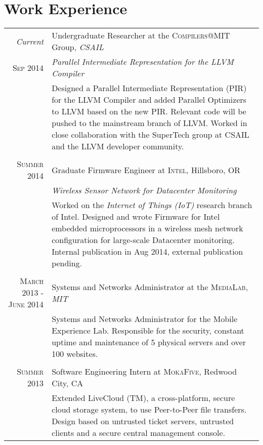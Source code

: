 \documentclass[lettersize,10pt]{article}
\begin{document}
\section{Work Experience}
\begin{tabular}{r|p{11cm}}
 \emph{Current} & Undergraduate Researcher at the \textsc{Compilers@MIT} Group, \emph{CSAIL} \\\textsc{Sep 2014}&\emph{Parallel Intermediate Representation for the LLVM Compiler}\\&\footnotesize{Designed a Parallel Intermediate Representation (PIR) for the LLVM Compiler and added Parallel Optimizers to LLVM based on the new PIR. Relevant code will be pushed to the mainstream branch of LLVM. Worked in close collaboration with the SuperTech group at CSAIL and the LLVM developer community. }\\\multicolumn{2}{c}{} \\

 \textsc{Summer 2014} & Graduate Firmware Engineer at \textsc{Intel}, Hillsboro, OR \\&\emph{Wireless Sensor Network for Datacenter Monitoring}\\&\footnotesize{Worked on the \textit{Internet of Things (IoT)} research branch of Intel. Designed and wrote Firmware for Intel embedded microprocessors in a wireless mesh network configuration for large-scale Datacenter monitoring. Internal publication in Aug 2014, external publication pending.}\\\multicolumn{2}{c}{} \\

\textsc{March 2013 - June 2014} & Systems and Networks Administrator at the \textsc{MediaLab},  \emph{MIT}\\&\footnotesize{Systems and Networks Administrator for the Mobile Experience Lab. Responsible for the security, constant uptime and maintenance of 5 physical servers and over 100 websites.}\\\multicolumn{2}{c}{} \\

\textsc{Summer 2013} & Software Engineering Intern at \textsc{MokaFive}, Redwood City, CA\\&\footnotesize{Extended LiveCloud (TM), a cross-platform, secure cloud storage system, to use Peer-to-Peer file transfers. Design based on untrusted ticket servers, untrusted clients and a secure central management console.}
\end{tabular}

\end{document}
